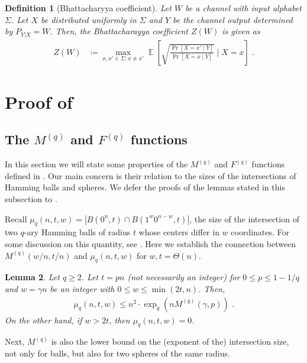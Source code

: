 \documentclass{article}
\DeclareMathOperator*{\E}{\mathbb{E}}
\theoremstyle{plain}
\newtheorem{definition}{Definition}%
\theoremstyle{plain}
\theoremstyle{plain}
\theoremstyle{plain}
\theoremstyle{plain}
\theoremstyle{plain}
\theoremstyle{plain}
\newtheorem{lemma}[definition]{Lemma}%
\theoremstyle{plain}
\theoremstyle{plain}
\theoremstyle{plain}
\theoremstyle{remark}
\theoremstyle{remark}
\theoremstyle{remark}
\theoremstyle{plain}
\begin{document}
\begin{definition}[Bhattacharyya coefficient]
\label{def:bhat-coeff}
Let $W$ be a channel with input
alphabet $\Sigma$.
Let $X$ be distributed uniformly in $\Sigma$
and $Y$ be the channel output
determined
by $P_{Y|X}=W$. Then, the Bhattacharayya coefficient
$Z(W)$ is given as
\begin{align*}
Z(W)&\coloneqq
\max_{x,x'\in\Sigma: x\ne x'}\E\left[
\sqrt{\frac{\Pr[X=x'\;\vert\;Y]}
{\Pr[X=x\;\vert\;Y]}}
\;\Big\vert\;X=x
\right]\;.
\end{align*}
\end{definition}

\section{Proof of }
\label{sec:proof-of-list-qsc}

\subsection{The $M^{(q)}$ and $F^{(q)}$ functions}

In this section we will state some properties
of the $M^{(q)}$ and $F^{(q)}$ functions defined in
. Our main concern is their
relation to the sizes of the intersections of Hamming balls
and spheres.
We defer the proofs of the lemmas stated in
this subsection to .

Recall $\mu_q(n,t,w)=|B(0^n,t)\cap B(1^{w}0^{n-w},t)|$, the size of the intersection of two 
$q$-ary Hamming balls of radius $t$ whose centers differ in $w$ coordinates.
For some discussion on this 
quantity, see \cite[Section 3]{dong2023number}.
Here we establish the connection between
$M^{(q)}(w/n,t/n)$ and
$\mu_q(n,t,w)$ for $w,t=\Theta(n)$.

\begin{lemma}
    \label{lem:qary_balls_intersection}
    Let $q\ge 2$.
    Let $t=p n$ (not necessarily an integer)
    for $0\le p\le 1-1/q$
    and $w=\gamma n$ be an integer
    with $0\le w\le \min(2t,n)$. Then,
\begin{align*}
\mu_q(n,t,w)\le n^2\cdot \exp_q\left(nM^{(q)}(\gamma,p)
\right)\;.
\end{align*}
On the other hand, if $w>2t$, then
$\mu_q(n,t,w)=0$.
\end{lemma}

Next, $M^{(q)}$ is also
the lower bound on the (exponent of the) 
intersection size, not only for balls,
but also for two spheres of the same radius.
\end{document}
